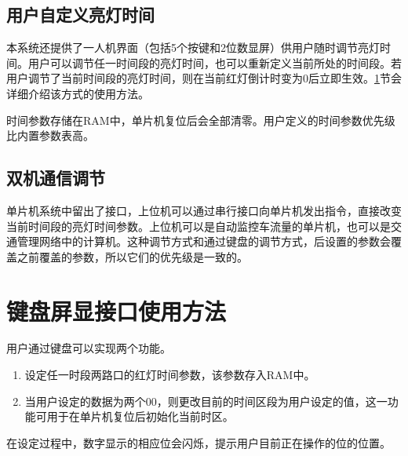 \subsection{用户自定义亮灯时间} 本系统还提供了一人机界面（包括5个按键和2位数显屏）供用户随时调节亮灯时间。用户可以调节任一时间段的亮灯时间，也可以重新定义当前所处的时间段。若用户调节了当前时间段的亮灯时间，则在当前红灯倒计时变为0后立即生效。\ref{sec:functionkeyboard}节会详细介绍该方式的使用方法。

时间参数存储在RAM中，单片机复位后会全部清零。用户定义的时间参数优先级比内置参数表高。
\subsection{双机通信调节} 单片机系统中留出了接口，上位机可以通过串行接口向单片机发出指令，直接改变当前时间段的亮灯时间参数。上位机可以是自动监控车流量的单片机，也可以是交通管理网络中的计算机。这种调节方式和通过键盘的调节方式，后设置的参数会覆盖之前覆盖的参数，所以它们的优先级是一致的。

\section{键盘屏显接口使用方法} \label{sec:functionkeyboard}
用户通过键盘可以实现两个功能。
\begin{enumerate}
\item 设定任一时段两路口的红灯时间参数，该参数存入RAM中。
\item 当用户设定的数据为两个00，则更改目前的时间区段为用户设定的值，这一功能可用于在单片机复位后初始化当前时区。
\end{enumerate}
在设定过程中，数字显示的相应位会闪烁，提示用户目前正在操作的位的位置。
